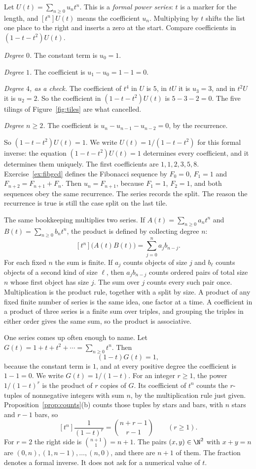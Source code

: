 \begin{examplex}
Let $U(t)=\sum_{n\ge 0}u_nt^n$. This is a \emph{formal power series}: $t$ is a marker for the length, and $[t^n]U(t)$ means the coefficient $u_n$. Multiplying by $t$ shifts the list one place to the right and inserts a zero at the start. Compare coefficients in $(1-t-t^2)U(t)$.

\emph{Degree $0$.} The constant term is $u_0=1$.

\emph{Degree $1$.} The coefficient is $u_1-u_0=1-1=0$.

\emph{Degree $4$, as a check.} The coefficient of $t^4$ in $U$ is $5$, in $tU$ it is $u_3=3$, and in $t^2U$ it is $u_2=2$. So the coefficient in $(1-t-t^2)U(t)$ is $5-3-2=0$. The five tilings of Figure~\ref{fig:tiles} are what cancelled.

\emph{Degree $n\ge 2$.} The coefficient is $u_n-u_{n-1}-u_{n-2}=0$, by the recurrence.

So $(1-t-t^2)U(t)=1$. We write $U(t)=1/(1-t-t^2)$ for this formal inverse: the equation $(1-t-t^2)U(t)=1$ determines every coefficient, and it determines them uniquely. The first coefficients are $1,1,2,3,5,8$. Exercise~\ref{ex:fibgcd} defines the Fibonacci sequence by $F_0=0$, $F_1=1$ and $F_{n+2}=F_{n+1}+F_n$. Then $u_n=F_{n+1}$, because $F_1=1$, $F_2=1$, and both sequences obey the same recurrence. The series records the split. The reason the recurrence is true is still the case split on the last tile.
\end{examplex}

The same bookkeeping multiplies two series. If $A(t)=\sum_{n\ge 0}a_nt^n$ and $B(t)=\sum_{n\ge 0}b_nt^n$, the product is defined by collecting degree $n$:
\[
[t^n]\bigl(A(t)B(t)\bigr)=\sum_{j=0}^n a_jb_{n-j}.
\]
For each fixed $n$ the sum is finite. If $a_j$ counts objects of size $j$ and $b_\ell$ counts objects of a second kind of size $\ell$, then $a_jb_{n-j}$ counts ordered pairs of total size $n$ whose first object has size $j$. The sum over $j$ counts every such pair once. Multiplication is the product rule, together with a split by size. A product of any fixed finite number of series is the same idea, one factor at a time. A coefficient in a product of three series is a finite sum over triples, and grouping the triples in either order gives the same sum, so the product is associative.

One series comes up often enough to name. Let $G(t)=1+t+t^2+\cdots=\sum_{n\ge 0}t^n$. Then
\[
(1-t)G(t)=1,
\]
because the constant term is $1$, and at every positive degree the coefficient is $1-1=0$. We write $G(t)=1/(1-t)$. For an integer $r\ge 1$, the power $1/(1-t)^r$ is the product of $r$ copies of $G$. Its coefficient of $t^n$ counts the $r$-tuples of nonnegative integers with sum $n$, by the multiplication rule just given. Proposition~\ref{prop:counts}(b) counts those tuples by stars and bars, with $n$ stars and $r-1$ bars, so
\[
[t^n]\frac1{(1-t)^r}=\binom{n+r-1}{r-1}\qquad(r\ge 1).
\]
For $r=2$ the right side is $\binom{n+1}{1}=n+1$. The pairs $(x,y)\in\N^2$ with $x+y=n$ are $(0,n),(1,n-1),\dots,(n,0)$, and there are $n+1$ of them. The fraction denotes a formal inverse. It does not ask for a numerical value of $t$.

